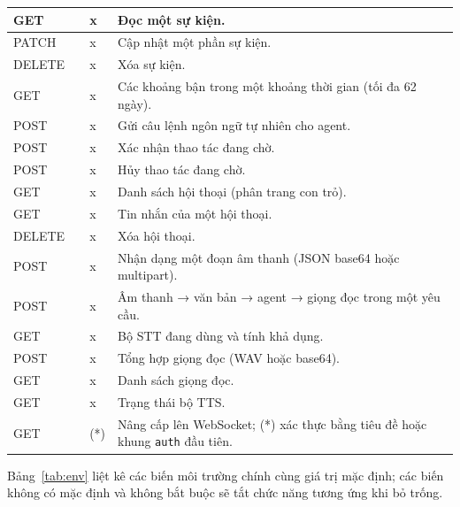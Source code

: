 {\begin{longtable}{|C{1.75cm}|L{5.3cm}|C{0.8cm}|L{6.38cm}|}
GET &  & x & Đọc một sự kiện.\\\hline
PATCH &  & x & Cập nhật một phần sự kiện.\\\hline
DELETE &  & x & Xóa sự kiện.\\\hline
GET &  & x & Các khoảng bận trong một khoảng thời gian (tối đa 62 ngày).\\\hline
POST &  & x & Gửi câu lệnh ngôn ngữ tự nhiên cho agent.\\\hline
POST &  & x & Xác nhận thao tác đang chờ.\\\hline
POST &  & x & Hủy thao tác đang chờ.\\\hline
GET &  & x & Danh sách hội thoại (phân trang con trỏ).\\\hline
GET &  & x & Tin nhắn của một hội thoại.\\\hline
DELETE &  & x & Xóa hội thoại.\\\hline
POST &  & x & Nhận dạng một đoạn âm thanh (JSON base64 hoặc multipart).\\\hline
POST &  & x & Âm thanh → văn bản → agent → giọng đọc trong một yêu cầu.\\\hline
GET &  & x & Bộ STT đang dùng và tính khả dụng.\\\hline
POST &  & x & Tổng hợp giọng đọc (WAV hoặc base64).\\\hline
GET &  & x & Danh sách giọng đọc.\\\hline
GET &  & x & Trạng thái bộ TTS.\\\hline
GET &  & (*) & Nâng cấp lên WebSocket; (*) xác thực bằng tiêu đề hoặc khung \texttt{auth} đầu tiên.\\\hline
\end{longtable}}

Bảng~\ref{tab:env} liệt kê các biến môi trường chính cùng giá trị mặc định; các biến không có mặc định và không bắt buộc sẽ tắt chức năng tương ứng khi bỏ trống.

